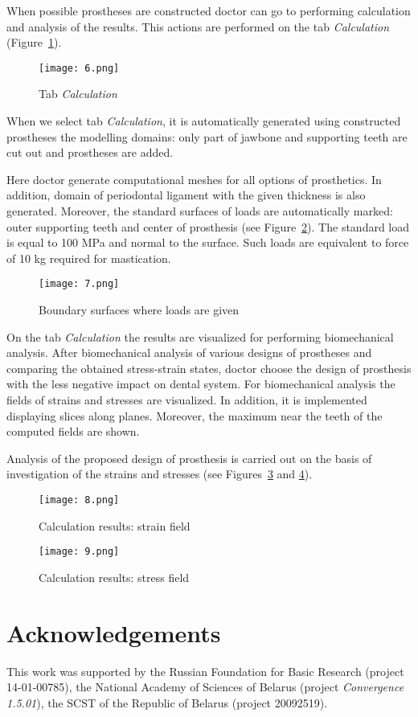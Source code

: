 \documentclass{elsarticle}
\begin{document}
When possible prostheses are constructed doctor can go to
performing calculation and analysis of the results. This actions are
performed on the tab \emph{Calculation} (Figure~\ref{fig:6}).
\begin{figure}[h]
  \centering
  \texttt{[image: 6.png]}
  \caption{Tab \emph{Calculation}}
  \label{fig:6}
\end{figure}

When we select tab \emph{Calculation}, it is automatically generated
using constructed prostheses the modelling domains: only part of
jawbone and supporting teeth are cut out and prostheses are added.

Here doctor generate computational meshes for all options of
prosthetics. In addition, domain of periodontal ligament with the given
thickness is also generated. Moreover, the standard surfaces of loads
are automatically marked: outer supporting teeth and center of prosthesis
(see Figure~\ref{fig:7}). The standard load is equal to 100 MPa and
normal to the surface. Such loads are equivalent to force of 10 kg
required for mastication.
\begin{figure}[h]
  \centering
  \texttt{[image: 7.png]}
  \caption{Boundary surfaces where loads are given}
  \label{fig:7}
\end{figure}

On the tab \emph{Calculation} the results are visualized for performing
biomechanical analysis. After biomechanical analysis of various
designs of prostheses and comparing the obtained stress-strain states,
doctor choose the design of prosthesis with the less negative impact
on dental system. For biomechanical analysis the fields of strains and
stresses are visualized. In addition, it is implemented displaying
slices along planes. Moreover, the maximum near the teeth of the
computed fields are shown.

Analysis of the proposed design of prosthesis is carried out on the
basis of investigation of the strains and stresses (see
Figures~\ref{fig:8} and \ref{fig:9}). 
\begin{figure}[h]
  \centering
  \texttt{[image: 8.png]}
  \caption{Calculation results: strain field}
  \label{fig:8}
\end{figure}

\clearpage

\begin{figure}[h]
  \centering
  \texttt{[image: 9.png]}
  \caption{Calculation results: stress field}
  \label{fig:9}
\end{figure}

\section*{Acknowledgements}

This work was supported by the Russian Foundation for Basic Research
(project 14-01-00785), the National Academy of Sciences of Belarus
(project \emph{Convergence 1.5.01}), the SCST of the Republic of Belarus (project 20092519).




\end{document}
